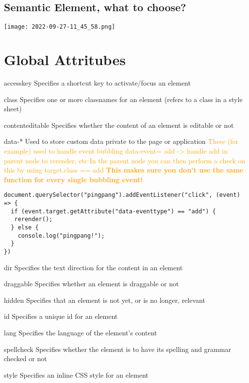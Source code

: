 \documentclass[main.tex,fontsize=6pt,paper=a4,paper=landscape,DIV=calc,]{scrartcl}
\begin{document}
\begin{multicols*}{4}
\subsection{Semantic Element, what to choose?}
\texttt{[image: 2022-09-27-11\_45\_58.png]}
\section{Global Attritubes}


accesskey  Specifies a shortcut key to activate/focus an element

class  Specifies one or more classnames for an element (refers to a class in a style sheet)

contenteditable  Specifies whether the content of an element is editable or not

data-*  Used to store custom data private to the page or application\newline
\textcolor{orange}{These (for example) used to handle event bubbling\newline 
data-event= add -> handle add in parent node to rerender, etc\newline
In the parent node you can then perform a check on this by using target.class == add\newline
\textbf{This makes sure you don't use the same function for every single bubbling event!}}\newline
\vspace{-2mm}
\begin{lstlisting}
document.querySelector("pingpang").addEventListener("click", (event) => { 
  if (event.target.getAttribute("data-eventtype") == "add") {
   rerender();
  } else {
    console.log("pingpang!");
  }
})
\end{lstlisting}
\vspace{2mm}


dir  Specifies the text direction for the content in an element

draggable  Specifies whether an element is draggable or not

hidden 	Specifies that an element is not yet, or is no longer, relevant

id  Specifies a unique id for an element

lang  Specifies the language of the element's content

spellcheck  Specifies whether the element is to have its spelling and grammar checked or not

style  Specifies an inline CSS style for an element


\end{multicols*}
\end{document}
